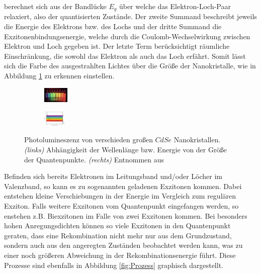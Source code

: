       berechnet sich aus der Bandlücke $E_g$ über welche das Elektron-Loch-Paar relaxiert, also der quantisierten Zustände. Der zweite Summand beschreibt jeweils die Energie des Elektrons bzw. des Lochs und der dritte Summand die Exzitonenbindungsenergie, welche durch die Coulomb-Wechselwirkung zwischen Elektron und Loch gegeben ist. Der letzte Term berücksichtigt räumliche Einschränkung, die sowohl das Elektron als auch das Loch erfährt.
      Somit lässt sich die Farbe des ausgestrahlten Lichtes über die Größe der Nanokristalle, wie in Abbildung \ref{fig:Farbe} zu erkennen einstellen.
      \begin{figure}[h]
        \begin{subfigure}{0.48\textwidth}
          \centering
          \includegraphics[height=0.75cm]{pictures/Farbe.png}
        \end{subfigure}
        \hfill
        \begin{subfigure}{0.48\textwidth}
          \centering
          \includegraphics[height=0.75cm]{pictures/Farbe2.png}
        \end{subfigure}
        \caption{Photolumineszenz von verschieden großen $CdSe$ Nanokristallen. \textit{(links)} Abhängigkeit der Wellenlänge bzw. Energie von der Größe der Quantenpunkte. \textit{(rechts)} Entnommen aus \cite{tu_dortmund_versuchsanleitung_2021-6}}
        \label{fig:Farbe}
      \end{figure}
      Befinden sich bereits Elektronen im Leitungsband und/oder Löcher im Valenzband, so kann es zu sogenannten geladenen Exzitonen kommen. Dabei entstehen kleine Verschiebungen in der Energie im Vergleich zum regulären Exziton.
      Falls weitere Exzitonen vom Quantenpunkt eingefangen werden, so enstehen z.B. Biexzitonen im Falle von zwei Exzitonen kommen. Bei besonders hohen Anregungsdichten können so viele Exzitonen in den Quantenpunkt geraten, dass eine Rekombination nicht mehr nur aus dem Grundzustand, sondern auch aus den angeregten Zuständen beobachtet werden kann, was zu einer noch größeren Abweichung in der Rekombinationsenergie führt. Diese Prozesse sind ebenfalls in Abbildung \ref{fig:Prozess} graphisch dargestellt.


